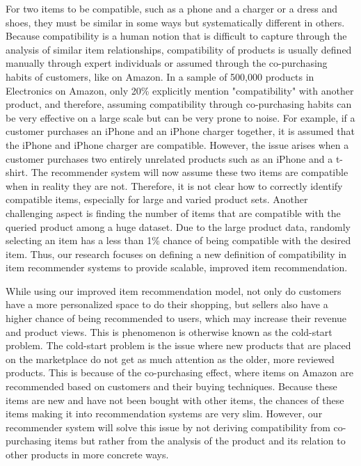 For two items to be compatible, such as a phone and a charger or a dress and shoes, they must be similar in some ways but systematically different in others. Because compatibility is a human notion that is difficult to capture through the analysis of similar item relationships, compatibility of products is usually defined manually through expert individuals or assumed through the co-purchasing habits of customers, like on Amazon. In a sample of 500,000 products in Electronics on Amazon, only 20\% explicitly mention "compatibility" with another product, and therefore, assuming compatibility through co-purchasing habits can be very effective on a large scale but can be very prone to noise. For example, if a customer purchases an iPhone and an iPhone charger together, it is assumed that the iPhone and iPhone charger are compatible. However, the issue arises when a customer purchases two entirely unrelated products such as an iPhone and a t-shirt. The recommender system will now assume these two items are compatible when in reality they are not. Therefore, it is not clear how to correctly identify compatible items, especially for large and varied product sets. Another challenging aspect is finding the number of items that are compatible with the queried product among a huge dataset. Due to the large product data, randomly selecting an item has a less than 1\% chance of being compatible with the desired item. Thus, our research focuses on defining a new definition of compatibility in item recommender systems to provide scalable, improved item recommendation.


While using our improved item recommendation model, not only do customers have a more personalized space to do their shopping, but sellers also have a higher chance of being recommended to users, which may increase their revenue and product views. This is phenomenon is otherwise known as the cold-start problem. The cold-start problem is the issue where new products that are placed on the marketplace do not get as much attention as the older, more reviewed products. This is because of the co-purchasing effect, where items on Amazon are recommended based on customers and their buying techniques. Because these items are new and have not been bought with other items, the chances of these items making it into recommendation systems are very slim. However, our recommender system will solve this issue by not deriving compatibility from co-purchasing items but rather from the analysis of the product and its relation to other products in more concrete ways.


